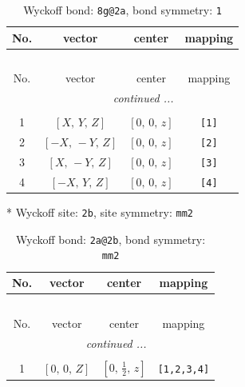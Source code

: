 \documentclass[fleqn,8pt]{jsarticle}
\begin{document}
\begin{longtable}{cccc}
\caption{Wyckoff bond: {\tt 8g@2a}, bond symmetry: {\tt 1}}
 \\
 \hline \hline
No. & vector & center & mapping \\ \hline \endfirsthead

\multicolumn{3}{l}{\tablename\ \thetable{}} \\
 \hline \hline
No. & vector & center & mapping \\ \hline \endhead

 \hline \hline
\multicolumn{3}{r}{\footnotesize\it continued ...} \\ \endfoot

 \hline \hline
\multicolumn{3}{r}{} \\ \endlastfoot

1 & $\left[ X,\, Y,\, Z \right]$ & $\left[ 0,\, 0,\, z \right]$ & {\tt [1]} \\ \hline
2 & $\left[ - X,\, - Y,\, Z \right]$ & $\left[ 0,\, 0,\, z \right]$ & {\tt [2]} \\ \hline
3 & $\left[ X,\, - Y,\, Z \right]$ & $\left[ 0,\, 0,\, z \right]$ & {\tt [3]} \\ \hline
4 & $\left[ - X,\, Y,\, Z \right]$ & $\left[ 0,\, 0,\, z \right]$ & {\tt [4]} \\
\end{longtable}
* Wyckoff site: {\tt 2b}, site symmetry: {\tt mm2}
\renewcommand{\arraystretch}{1.2}
\begin{longtable}{cccc}
\caption{Wyckoff bond: {\tt 2a@2b}, bond symmetry: {\tt mm2}}
 \\
 \hline \hline
No. & vector & center & mapping \\ \hline \endfirsthead

\multicolumn{3}{l}{\tablename\ \thetable{}} \\
 \hline \hline
No. & vector & center & mapping \\ \hline \endhead

 \hline \hline
\multicolumn{3}{r}{\footnotesize\it continued ...} \\ \endfoot

 \hline \hline
\multicolumn{3}{r}{} \\ \endlastfoot

1 & $\left[ 0,\, 0,\, Z \right]$ & $\left[ 0,\, \frac{1}{2},\, z \right]$ & {\tt [1,2,3,4]} \\
\end{longtable}
\renewcommand{\arraystretch}{1.2}
\end{document}
